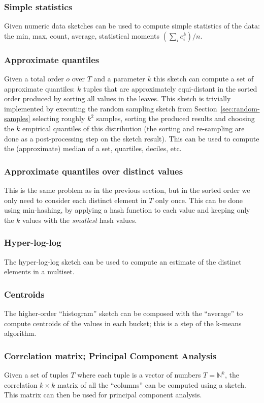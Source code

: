 \documentclass{article}
\newcommand{\N}{\ensuremath{\mathbb{N}}\xspace}
\begin{document}
\subsubsection{Simple statistics}

Given numeric data sketches can be used to compute simple statistics
of the data: the min, max, count, average, statistical moments
$(\sum_i e_i^k)/n$.

\subsubsection{Approximate quantiles}

Given a total order $o$ over $T$ and a parameter $k$ this sketch can
compute a set of approximate quantiles: $k$ tuples that are
approximately equi-distant in the sorted order produced by sorting all
values in the leaves.  This sketch is trivially implemented by
executing the random sampling sketch from
Section~\ref{sec:random-samples} selecting roughly $k^2$ samples,
sorting the produced results and choosing the $k$ empirical quantiles
of this distribution (the sorting and re-sampling are done as a
post-processing step on the sketch result).  This can be used to
compute the (approximate) median of a set, quartiles, deciles, etc.

\subsubsection{Approximate quantiles over distinct values}

This is the same problem as in the previous section, but in the sorted
order we only need to consider each distinct element in $T$ only once.
This can be done using min-hashing, by applying a hash function to
each value and keeping only the $k$ values with the \emph{smallest}
hash values.

\subsubsection{Hyper-log-log}

The hyper-log-log sketch can be used to compute an estimate of the distinct
elements in a multiset.

\subsubsection{Centroids}

The higher-order ``histogram'' sketch can be composed with the
``average'' to compute centroids of the values in each bucket; this is
a step of the k-means algorithm.

\subsubsection{Correlation matrix; Principal Component Analysis}

Given a set of tuples $T$ where each tuple is a vector of numbers $T =
\N^k$, the correlation $k \times k$ matrix of all the ``columns'' can
be computed using a sketch.  This matrix can then be used for
principal component analysis.
\end{document}
